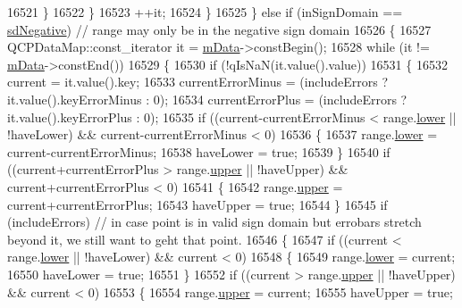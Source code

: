 \begin{DoxyCode}
16521         \}
16522       \}
16523       ++it;
16524     \}
16525   \} \textcolor{keywordflow}{else} \textcolor{keywordflow}{if} (inSignDomain == \hyperlink{class_q_c_p_abstract_plottable_a661743478a1d3c09d28ec2711d7653d8a0fc9a70796ef60ad18ddd18056e6dc63}{sdNegative}) \textcolor{comment}{// range may only be in the negative sign domain}
16526   \{
16527     QCPDataMap::const\_iterator it = \hyperlink{class_q_c_p_graph_a8457c840f69a0ac49f61d30a509c5d08}{mData}->constBegin();
16528     \textcolor{keywordflow}{while} (it != \hyperlink{class_q_c_p_graph_a8457c840f69a0ac49f61d30a509c5d08}{mData}->constEnd())
16529     \{
16530       \textcolor{keywordflow}{if} (!qIsNaN(it.value().value))
16531       \{
16532         current = it.value().key;
16533         currentErrorMinus = (includeErrors ? it.value().keyErrorMinus : 0);
16534         currentErrorPlus = (includeErrors ? it.value().keyErrorPlus : 0);
16535         \textcolor{keywordflow}{if} ((current-currentErrorMinus < range.\hyperlink{class_q_c_p_range_aa3aca3edb14f7ca0c85d912647b91745}{lower} || !haveLower) && current-currentErrorMinus < 0)
16536         \{
16537           range.\hyperlink{class_q_c_p_range_aa3aca3edb14f7ca0c85d912647b91745}{lower} = current-currentErrorMinus;
16538           haveLower = \textcolor{keyword}{true};
16539         \}
16540         \textcolor{keywordflow}{if} ((current+currentErrorPlus > range.\hyperlink{class_q_c_p_range_ae44eb3aafe1d0e2ed34b499b6d2e074f}{upper} || !haveUpper) && current+currentErrorPlus < 0)
16541         \{
16542           range.\hyperlink{class_q_c_p_range_ae44eb3aafe1d0e2ed34b499b6d2e074f}{upper} = current+currentErrorPlus;
16543           haveUpper = \textcolor{keyword}{true};
16544         \}
16545         \textcolor{keywordflow}{if} (includeErrors) \textcolor{comment}{// in case point is in valid sign domain but errobars stretch beyond it, we
       still want to geht that point.}
16546         \{
16547           \textcolor{keywordflow}{if} ((current < range.\hyperlink{class_q_c_p_range_aa3aca3edb14f7ca0c85d912647b91745}{lower} || !haveLower) && current < 0)
16548           \{
16549             range.\hyperlink{class_q_c_p_range_aa3aca3edb14f7ca0c85d912647b91745}{lower} = current;
16550             haveLower = \textcolor{keyword}{true};
16551           \}
16552           \textcolor{keywordflow}{if} ((current > range.\hyperlink{class_q_c_p_range_ae44eb3aafe1d0e2ed34b499b6d2e074f}{upper} || !haveUpper) && current < 0)
16553           \{
16554             range.\hyperlink{class_q_c_p_range_ae44eb3aafe1d0e2ed34b499b6d2e074f}{upper} = current;
16555             haveUpper = \textcolor{keyword}{true};

\end{DoxyCode}
